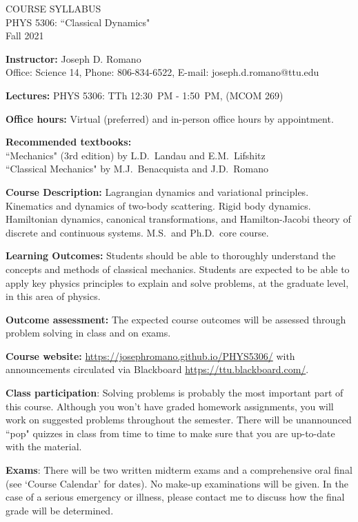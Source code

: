 \documentclass[11pt]{NSF}
\begin{document}
\begin{center}
COURSE SYLLABUS\\
PHYS 5306: ``Classical Dynamics"\\
Fall 2021\\
\end{center}

{\bf Instructor:}
Joseph D. Romano\\
Office: Science 14, Phone: 806-834-6522, E-mail: joseph.d.romano@ttu.edu

{\bf Lectures:}
PHYS 5306: TTh 12:30~PM - 1:50~PM, (MCOM 269)

{\bf Office hours:}
Virtual (preferred) and in-person office hours by appointment.

{\bf Recommended textbooks:}\\
``Mechanics" (3rd edition) by L.D.~Landau and E.M.~Lifshitz\\
``Classical Mechanics" by M.J.~Benacquista and J.D.~Romano

{\bf Course Description:}
Lagrangian dynamics and variational principles. Kinematics and dynamics of
two-body scattering. Rigid body dynamics. Hamiltonian dynamics, canonical
transformations, and Hamilton-Jacobi theory of discrete and continuous systems.
M.S.\ and Ph.D.\ core course.  

{\bf Learning Outcomes:}
Students should be able to thoroughly understand the concepts and
methods of classical mechanics. Students are expected to be
able to apply key physics principles to explain and solve problems,
at the graduate level, in this area of physics.

{\bf Outcome assessment:} 
The expected course outcomes will be assessed through problem solving 
in class and on exams.

{\bf Course website:}
\url{https://josephromano.github.io/PHYS5306/} with announcements
circulated via Blackboard \url{https://ttu.blackboard.com/}.

{\bf Class participation}:
Solving problems is probably the most important part of 
this course.
Although you won't have graded homework assignments, you will 
work on suggested problems throughout the semester.
There will be unannounced ``pop" quizzes in class from time to time 
to make sure that you are up-to-date with the material.

{\bf Exams}:
There will be two written midterm exams and a comprehensive 
oral final (see `Course Calendar' for dates).
No make-up examinations will be given. In the case of a
serious emergency or illness, please contact me to discuss how 
the final grade will be determined.
\end{document}
